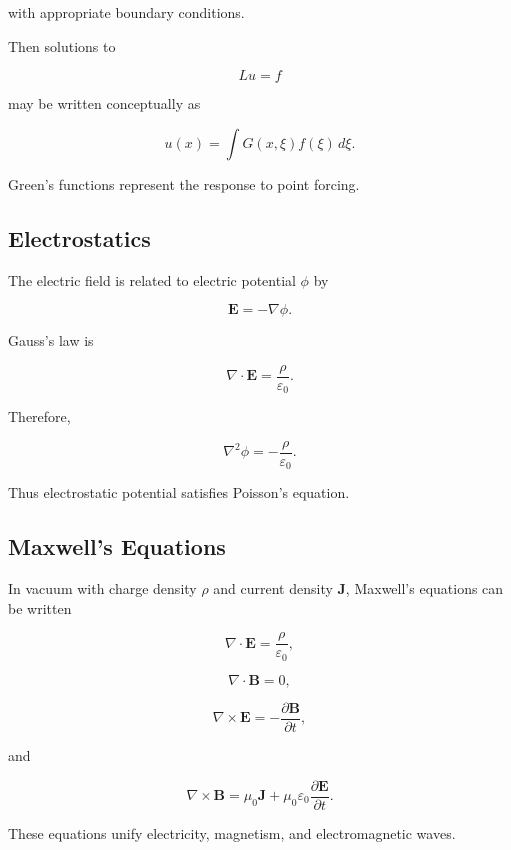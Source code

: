 with appropriate boundary conditions.

Then solutions to

\[
L u=f
\]

may be written conceptually as

\[
\boxed{
u(x)
=
\int
G(x,\xi)f(\xi)\,d\xi.
}
\]

Green's functions represent the response to point forcing.

\subsection{Electrostatics}
\label{subsec:electrostatics}

The electric field is related to electric potential \(\phi\) by

\[
\boxed{
\mathbf{E}
=
-\nabla\phi.
}
\]

Gauss's law is

\[
\boxed{
\nabla\cdot\mathbf{E}
=
\frac{\rho}{\varepsilon_0}.
}
\]

Therefore,

\[
\boxed{
\nabla^2\phi
=
-\frac{\rho}{\varepsilon_0}.
}
\]

Thus electrostatic potential satisfies Poisson's equation.

\subsection{Maxwell's Equations}
\label{subsec:maxwells-equations}

In vacuum with charge density \(\rho\) and current density \(\mathbf{J}\),
Maxwell's equations can be written

\[
\boxed{
\nabla\cdot\mathbf{E}
=
\frac{\rho}{\varepsilon_0},
}
\]

\[
\boxed{
\nabla\cdot\mathbf{B}
=
0,
}
\]

\[
\boxed{
\nabla\times\mathbf{E}
=
-\frac{\partial\mathbf{B}}{\partial t},
}
\]

and

\[
\boxed{
\nabla\times\mathbf{B}
=
\mu_0\mathbf{J}
+
\mu_0\varepsilon_0
\frac{\partial\mathbf{E}}{\partial t}.
}
\]

These equations unify electricity, magnetism, and electromagnetic waves.

